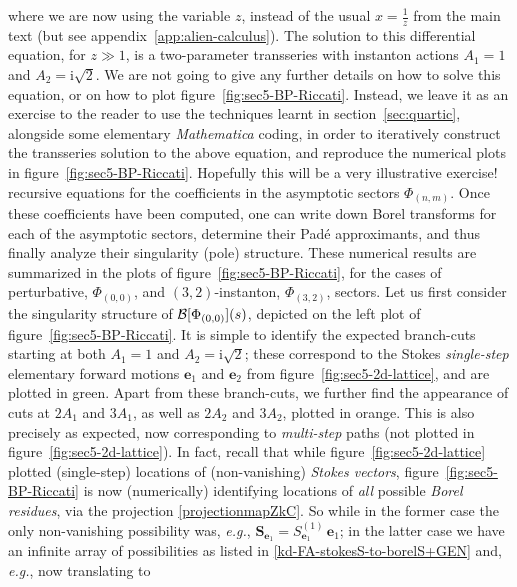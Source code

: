 \documentclass[11pt,a4paper]{article}
\newcommand{\CB}{{\cal B}}
\begin{document}
{where we are now using the variable $z$, instead of the usual $x = \frac{1}{z}$ from the main text (but see appendix~\ref{app:alien-calculus}). The solution to this differential equation, for $z\gg1$, is a two-parameter transseries with instanton actions $A_{1}=1$ and $A_{2}=\mathrm{i}\sqrt{2}$. We are not going to give any further details on how to solve this equation, or on how to plot figure~\ref{fig:sec5-BP-Riccati}. Instead, we leave it as an exercise to the reader to use the techniques learnt in section~\ref{sec:quartic}, alongside some elementary \textit{Mathematica} coding, in order to iteratively construct the transseries solution to the above equation, and reproduce the numerical plots in figure~\ref{fig:sec5-BP-Riccati}. Hopefully this will be a very illustrative exercise!} recursive equations for the coefficients in the asymptotic sectors $\Phi_{(n,m)}$. Once these coefficients have been computed, one can write down Borel transforms for each of the asymptotic sectors, determine their Pad\'e approximants, and thus finally analyze their singularity (pole) structure. These numerical results are summarized in the plots of figure~\ref{fig:sec5-BP-Riccati}, for the cases of perturbative, $\Phi_{(0,0)}$, and $(3,2)$-instanton, $\Phi_{(3,2)}$, sectors. Let us first consider the singularity structure of $\CB [\Phi_{(0,0)}] (s)$, depicted on the left plot of figure~\ref{fig:sec5-BP-Riccati}. It is simple to identify the expected branch-cuts starting at both $A_{1}=1$ and $A_{2}=\mathrm{i}\sqrt{2}$; these correspond to the Stokes \textit{single-step} elementary forward motions $\boldsymbol{e}_1$ and $\boldsymbol{e}_2$ from figure~\ref{fig:sec5-2d-lattice}, and are plotted in green. Apart from these branch-cuts, we further find the appearance of cuts at $2A_{1}$ and $3A_{1}$, as well as $2A_{2}$ and $3A_{2}$, plotted in orange. This is also precisely as expected, now corresponding to \textit{multi-step} paths (not plotted in figure~\ref{fig:sec5-2d-lattice}). In fact, recall that while figure~\ref{fig:sec5-2d-lattice} plotted (single-step) locations of (non-vanishing) \textit{Stokes vectors}, figure~\ref{fig:sec5-BP-Riccati} is now (numerically) identifying locations of \textit{all} possible \textit{Borel residues}, via the projection \eqref{projectionmapZkC}. So while in the former case the only non-vanishing possibility was, \textit{e.g.}, $\boldsymbol{S}_{\boldsymbol{e}_1} = S_{\boldsymbol{e}_1}^{(1)}\, \boldsymbol{e}_1$; in the latter case we have an infinite array of possibilities as listed in \eqref{kd-FA-stokesS-to-borelS+GEN} and, \textit{e.g.}, now translating to
\end{document}
